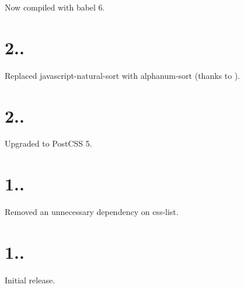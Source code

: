 
\begin{DoxyItemize}
\item Now compiled with babel 6.
\end{DoxyItemize}

\section*{2..}


\begin{DoxyItemize}
\item Replaced javascript-\/natural-\/sort with alphanum-\/sort (thanks to ).
\end{DoxyItemize}

\section*{2..}


\begin{DoxyItemize}
\item Upgraded to Post\+C\+SS 5.
\end{DoxyItemize}

\section*{1..}


\begin{DoxyItemize}
\item Removed an unnecessary dependency on css-\/list.
\end{DoxyItemize}

\section*{1..}


\begin{DoxyItemize}
\item Initial release. 
\end{DoxyItemize}